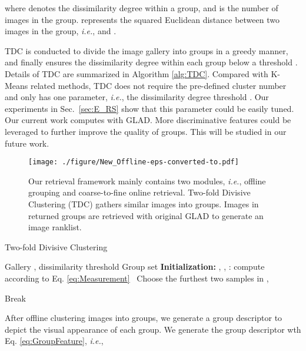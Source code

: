 \documentclass[sigconf]{acmart}
\begin{document}
where  denotes the dissimilarity degree within a group, and  is the number of images in the group.  represents the squared Euclidean distance between two images in the group, \emph{i.e.},  and .

TDC is conducted to divide the image gallery into groups in a greedy manner, and finally ensures the dissimilarity degree within each group below a threshold . Details of TDC are summarized in Algorithm \ref{alg:TDC}. Compared with K-Means related methods, TDC does not require the pre-defined cluster number and only has one parameter, \emph{i.e.}, the dissimilarity degree threshold . Our experiments in Sec.~\ref{sec:E_RS} show that this parameter could be easily tuned. Our current work computes  with GLAD. More discriminative features could be leveraged to further improve the quality of groups. This will be studied in our future work.

\begin{figure}
\begin{center}
\texttt{[image: ./figure/New\_Offline-eps-converted-to.pdf]}
\end{center}
\caption{Our retrieval framework mainly contains two modules,\emph{ i.e.}, offline grouping and coarse-to-fine online retrieval. Two-fold Divisive Clustering (TDC) gathers similar images into groups. Images in returned groups are retrieved with original GLAD to generate an image ranklist.}
\label{fig:offline}
\end{figure}


\label{sec:off}
\begin{algorithm}[htb]
\caption{Two-fold Divisive Clustering}
\label{alg:TDC}
\begin{algorithmic}[1]

	\REQUIRE Gallery , dissimilarity threshold 
	 \ENSURE Group set 
	\STATE \textbf{Initialization:} , ,  	
    \STATE {}
\STATE : compute  according to Eq. \eqref{eq:Measurement}\
   \IF {}
    \STATE  Choose the furthest two samples  in 
    \STATE  , 
    \FOR { }
    \IF {}
    \STATE   
    \ELSE
    \STATE  
    \ENDIF
    \ENDFOR

    \STATE  
    \STATE  
    \STATE  
    \ENDFOR
        \ELSE
    \STATE Break
\ENDIF

    \ENDWHILE

\end{algorithmic}
\end{algorithm}

After offline clustering images into groups, we generate a group descriptor to depict the visual appearance of each group. We generate the group descriptor wth Eq. \eqref{eq:GroupFeature}, \emph{i.e.},
\end{document}
